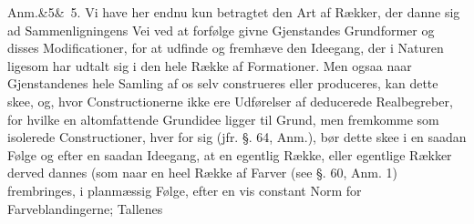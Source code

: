 \documentclass[12pt]{book}
\def\sperr#1{#1}%
\def\textit#1{#1}%
\newcommand{\sperr}[1]{\textls[180]{#1}}
\newcommand{\rubrik}[2]{%
  \par\vspace{1.1\baselineskip}%
  \begin{center}
    {\large\textit{#1}\par}\vspace{0.35\baselineskip}
    {#2\par}
  \end{center}
  \vspace{0.5\baselineskip}
  \phantomsection
  \addcontentsline{toc}{section}{\texorpdfstring{#1\ #2}{#1 #2}}%
}
\newcommand{\anm}[1]{%
  \par\vspace{0.5\baselineskip}%
  \noindent\hspace{\parindent}\sperr{Anm.}\ifx&#1&\else~\textit{#1}.\fi
  \enspace\ignorespaces
}
\begin{document}
\anm{5} Vi have her endnu kun betragtet den Art af Rækker, der danne sig ad
Sammenligningens Vei ved at forfølge givne Gjenstandes Grundformer og disses
Modificationer, for at udfinde og fremhæve den Ideegang, der i Naturen ligesom
har udtalt sig i den hele Række af Formationer. Men ogsaa naar Gjenstandenes hele
Samling af os selv construeres eller produceres, kan dette skee, og, hvor
Constructionerne ikke ere Udførelser af deducerede Realbegreber, for hvilke en
altomfattende Grundidee ligger til Grund, men fremkomme som isolerede
Constructioner, hver for sig (jfr. §. 64, Anm.), bør dette skee i en saadan Følge
og efter en saadan Ideegang, at en egentlig Række, eller egentlige Rækker derved
dannes (som naar en heel Række af Farver (see §. 60, Anm. 1) frembringes, i
planmæssig Følge, efter en vis constant Norm for Farveblandingerne; Tallenes
%
\end{document}
